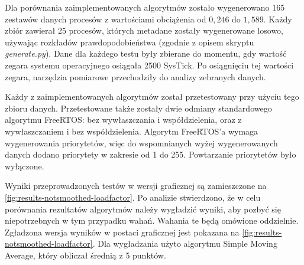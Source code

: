 \documentclass[../../main]{subfiles}
\begin{document}

Dla porównania zaimplementowanych algorytmów zostało wygenerowano 165 zestawów danych procesów z wartościami obciążenia od $0,246$ do $1,589$. Każdy zbiór zawierał 25 procesów, których metadane zostały wygenerowane losowo, używając rozkładów prawdopodobieństwa (zgodnie z opisem skryptu \textit{generate.py}). Dane dla każdego testu były zbierane do momentu, gdy wartość zegara systemu operacyjnego osiągała 2500 SysTick. Po osiągnięciu tej wartości zegara, narzędzia pomiarowe przechodziły do analizy zebranych danych.

Każdy z zaimplementowanych algorytmów został przetestowany przy użyciu tego zbioru danych. Przetestowane także zostały dwie odmiany standardowego algorytmu FreeRTOS: bez wywłaszczania i współdzielenia, oraz z wywłaszczaniem i bez współdzielenia. Algorytm FreeRTOS'a wymaga wygenerowania priorytetów, więc do wspomnianych wyżej wygenerowanych danych dodano priorytety w zakresie od 1 do 255. Powtarzanie priorytetów było wyłączone.

Wyniki przeprowadzonych testów w wersji graficznej są zamieszczone na \cref{fig:results-notsmoothed-loadfactor}. Po analizie stwierdzono, że w celu porównania rezultatów algorytmów należy wygładzić wyniki, aby pozbyć się niepotrzebnych w tym przypadku wahań. Wahania te będą omówione oddzielnie. Zgładzona wersja wyników w postaci graficznej jest pokazana na \cref{fig:results-notsmoothed-loadfactor}. Dla wygładzania użyto algorytmu Simple Moving Average, który obliczał średnią z 5 punktów.
\end{document}
